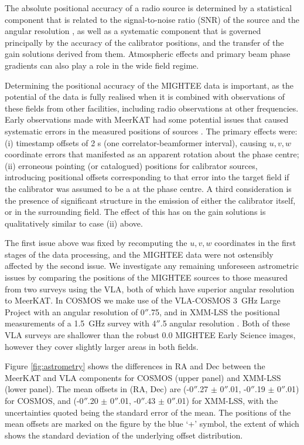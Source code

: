 \documentclass[usenatbib,usedcolumn]{mnras}
\begin{document}
The absolute positional accuracy of a radio source is determined by a statistical component that is related to the signal-to-noise ratio (SNR) of the source and the angular resolution \citep[e.g.][]{condon1997}, as well as a systematic component that is governed principally by the accuracy of the calibrator positions, and the transfer of the gain solutions derived from them. Atmospheric effects and primary beam phase gradients can also play a role in the wide field regime.

Determining the positional accuracy of the MIGHTEE data is important, as the potential of the data is fully realised when it is combined with observations of these fields from other facilities, including radio observations at other frequencies. Early observations made with MeerKAT had some potential issues that caused systematic errors in the measured positions of sources \citep[][see also Knowles et al., \emph{submitted}]{mauch2020}. The primary effects were: (i) timestamp offsets of 2 s (one correlator-beamformer interval), causing $u,v,w$ coordinate errors that manifested as an apparent rotation about the phase centre; (ii) erroneous pointing (or catalogued) positions for calibrator sources, introducing positional offsets corresponding to that error into the target field if the calibrator was assumed to be a at the phase centre. A third consideration is the presence of significant structure in the emission of either the calibrator itself, or in the surrounding field. The effect of this has on the gain solutions is qualitatively similar to case (ii) above.

The first issue above was fixed by recomputing the $u,v,w$ coordinates in the first stages of the data processing, and the MIGHTEE data were not ostensibly affected by the second issue. We investigate any remaining unforeseen astrometric issues by comparing the positions of the MIGHTEE sources to those measured from two surveys using the VLA, both of which have superior angular resolution to MeerKAT. In COSMOS we make use of the VLA-COSMOS 3~GHz Large Project \citep{smolcic2017} with an angular resolution of 0$''$.75, and in XMM-LSS the positional measurements of a 1.5~GHz survey with 4$''$.5 angular resolution \citep{heywood2020a}. Both of these VLA surveys are shallower than the robust 0.0 MIGHTEE Early Science images, however they cover slightly larger areas in both fields. 

Figure \ref{fig:astrometry} shows the differences in RA and Dec between the MeerKAT and VLA components for COSMOS (upper panel) and XMM-LSS (lower panel). The mean offsets in (RA, Dec) are  (-0$''$.27 $\pm$ 0$''$.01, -0$''$.19 $\pm$ 0$''$.01) for COSMOS, and (-0$''$.20 $\pm$ 0$''$.01, -0$''$.43 $\pm$ 0$''$.01) for XMM-LSS, with the uncertainties quoted being the standard error of the mean. The positions of the mean offsets are marked on the figure by the blue `+' symbol, the extent of which shows the standard deviation of the underlying offset distribution. 
\end{document}
